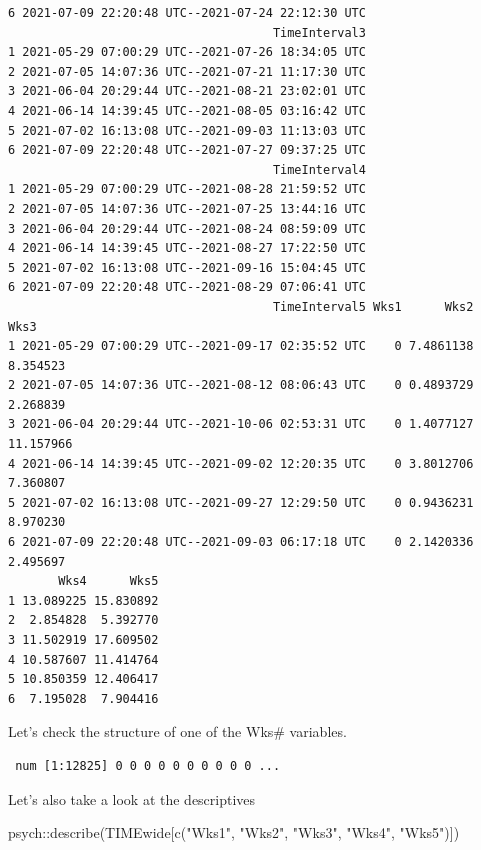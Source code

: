 \documentclass[
  english,
]{book}
\newenvironment{Shaded}{\begin{snugshade}}{\end{snugshade}}
\newcommand{\FunctionTok}[1]{\textcolor[rgb]{0.00,0.00,0.00}{#1}}
\newcommand{\NormalTok}[1]{#1}
\newcommand{\SpecialCharTok}[1]{\textcolor[rgb]{0.00,0.00,0.00}{#1}}
\newcommand{\StringTok}[1]{\textcolor[rgb]{0.31,0.60,0.02}{#1}}
\begin{document}
\begin{verbatim}
6 2021-07-09 22:20:48 UTC--2021-07-24 22:12:30 UTC
                                     TimeInterval3
1 2021-05-29 07:00:29 UTC--2021-07-26 18:34:05 UTC
2 2021-07-05 14:07:36 UTC--2021-07-21 11:17:30 UTC
3 2021-06-04 20:29:44 UTC--2021-08-21 23:02:01 UTC
4 2021-06-14 14:39:45 UTC--2021-08-05 03:16:42 UTC
5 2021-07-02 16:13:08 UTC--2021-09-03 11:13:03 UTC
6 2021-07-09 22:20:48 UTC--2021-07-27 09:37:25 UTC
                                     TimeInterval4
1 2021-05-29 07:00:29 UTC--2021-08-28 21:59:52 UTC
2 2021-07-05 14:07:36 UTC--2021-07-25 13:44:16 UTC
3 2021-06-04 20:29:44 UTC--2021-08-24 08:59:09 UTC
4 2021-06-14 14:39:45 UTC--2021-08-27 17:22:50 UTC
5 2021-07-02 16:13:08 UTC--2021-09-16 15:04:45 UTC
6 2021-07-09 22:20:48 UTC--2021-08-29 07:06:41 UTC
                                     TimeInterval5 Wks1      Wks2      Wks3
1 2021-05-29 07:00:29 UTC--2021-09-17 02:35:52 UTC    0 7.4861138  8.354523
2 2021-07-05 14:07:36 UTC--2021-08-12 08:06:43 UTC    0 0.4893729  2.268839
3 2021-06-04 20:29:44 UTC--2021-10-06 02:53:31 UTC    0 1.4077127 11.157966
4 2021-06-14 14:39:45 UTC--2021-09-02 12:20:35 UTC    0 3.8012706  7.360807
5 2021-07-02 16:13:08 UTC--2021-09-27 12:29:50 UTC    0 0.9436231  8.970230
6 2021-07-09 22:20:48 UTC--2021-09-03 06:17:18 UTC    0 2.1420336  2.495697
       Wks4      Wks5
1 13.089225 15.830892
2  2.854828  5.392770
3 11.502919 17.609502
4 10.587607 11.414764
5 10.850359 12.406417
6  7.195028  7.904416
\end{verbatim}

Let's check the structure of one of the Wks\# variables.

\begin{Shaded}
\end{Shaded}

\begin{verbatim}
 num [1:12825] 0 0 0 0 0 0 0 0 0 0 ...
\end{verbatim}

Let's also take a look at the descriptives

\begin{Shaded}
\begin{Highlighting}[]
\NormalTok{psych}\SpecialCharTok{::}\FunctionTok{describe}\NormalTok{(TIMEwide[}\FunctionTok{c}\NormalTok{(}\StringTok{"Wks1"}\NormalTok{, }\StringTok{"Wks2"}\NormalTok{, }\StringTok{"Wks3"}\NormalTok{, }\StringTok{"Wks4"}\NormalTok{, }\StringTok{"Wks5"}\NormalTok{)])}
\end{Highlighting}
\end{Shaded}
\end{document}

